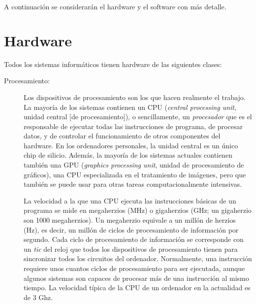 A continuación se considerarán el hardware y el software con más detalle. 

\section{Hardware} 

Todos los sistemas informáticos tienen hardware de las siguientes clases: 

\begin{description} \item[Procesamiento:] Los dispositivos de procesamiento son los que hacen realmente el trabajo. La mayoría de los sistemas contienen un CPU ({\em central processing unit}, unidad central [de procesamiento]), o sencillamente, un \emph{procesador} que es el responsable de ejecutar todas las instrucciones de programa, de procesar datos, y de controlar el funcionamiento de otros componentes del hardware. En los ordenadores personales, la unidad central es un único chip de silicio. Además, la mayoría de los sistemas actuales contienen también una GPU (\emph{graphics processing unit}, unidad de procesamiento de gráficos), una CPU especializada en el tratamiento de imágenes, pero que también se puede usar para otras tareas computacionalmente intensivas. 

La velocidad a la que una CPU ejecuta las instrucciones básicas de un programa se mide en megaherzios (MHz) o gigaherzios (GHz; un gigaherzio son 1000 megaherzios). Un megaherzio equivale a un millón de herzios (Hz), es decir, un millón de ciclos de procesamiento de información por segundo. Cada ciclo de procesamiento de información se corresponde con un \emph{tic} del reloj que todos los dispositivos de procesamiento tienen para sincronizar todos los circuitos del ordenador. Normalmente, una instrucción requiere unos cuantos ciclos de procesamiento para ser ejecutada, aunque algunos sistemas son capaces de procesar más de una instrucción al mismo tiempo. La velocidad típica de la CPU de un ordenador en la actualidad es de 3 Ghz. 


\end{description}
